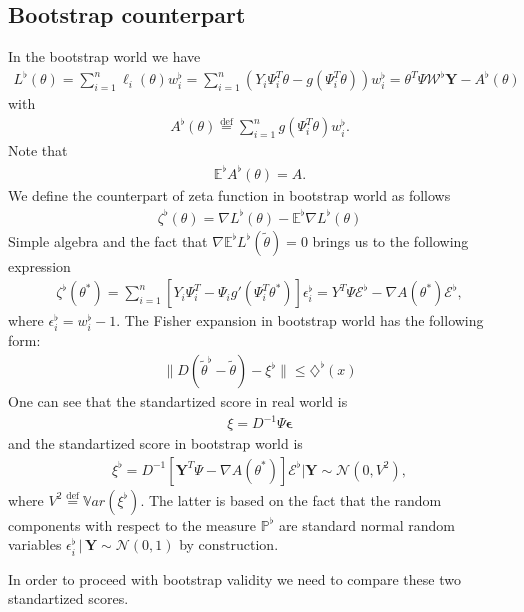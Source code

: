 \documentclass[12pt]{article}
\renewcommand{\=}[1]{\stackrel{#1}{=}} %
\providecommand{\e}{\epsilon}
\begin{document}
\subsection{Bootstrap counterpart}
In the bootstrap world we have 
\begin{align}
L^{\flat}(\theta) = \sum_{i=1}^n \ell_i(\theta) w_i^{\flat} = \sum_{i=1}^n \left(Y_i \Psi_i^T \theta - g(\Psi_i^T \theta)\right) w_i^{\flat} = \theta^T \Psi \mathcal{W}^{\flat}\mathbf{Y} - A^{\flat}(\theta)
\end{align}
with 
\begin{align}
A^{\flat}(\theta) \stackrel{\text{def}}{=} \sum_{i=1}^n g(\Psi_i^T \theta) w_i^{\flat}.
\end{align}
Note that 
\begin{align}
\mathbb{E}^{\flat} A^{\flat} (\theta) = A.
\end{align}
We define the counterpart of zeta function in bootstrap world as follows 
\begin{align}
\zeta^{\flat}(\theta) = \nabla L^{\flat}(\theta) - \mathbb{E}^{\flat} \nabla L^{\flat}(\theta)
\end{align}
Simple algebra and the fact that $\nabla \mathbb{E}^{\flat}L^{\flat}(\tilde{\theta}) = 0$ brings us to the following expression 
\begin{align}
\zeta^{\flat}({\theta}^*) = \sum_{i=1}^n \left[Y_i \Psi_i^T - \Psi_i g'(\Psi_i^T {\theta}^*)\right] \e_i^{\flat} = Y^T \Psi \mathcal{E}^{\flat} - \nabla A({\theta}^*) \mathcal{E}^{\flat},
\end{align}
where $\e_i^{\flat} = w_i^{\flat} - 1$.
The Fisher expansion in bootstrap world has the following form: 
\begin{align}
\| D(\tilde{\theta}^{\flat} - \tilde{\theta}) - \xi^{\flat} \| \le \diamondsuit^{\flat}(x) 
\end{align}
One can see that the standartized score in real world is 
\begin{align}
\xi = D^{-1} \Psi \mathbf{\e} 
\end{align}
and the standartized score in bootstrap world is 
\begin{align}
\xi^{\flat} = {D}^{-1} \left[\mathbf{Y}^T \Psi - \nabla A({\theta}^*)\right] \mathcal{E}^{\flat} | \mathbf{Y} \sim \mathcal{N}(0, V^2),
\end{align}
where $V^2 \stackrel{\text{def}}{=} \mathbb{V}ar(\xi^{\flat})$. The latter is based on the fact that the random components with respect to the measure $\mathbb{P}^{\flat}$ are standard normal random variables $\e_i^{\flat} \, | \, \mathbf{Y} \sim \mathcal{N}(0, 1)$ by construction.
\par In order to proceed with bootstrap validity we need to compare these two standartized scores. 
\end{document}
